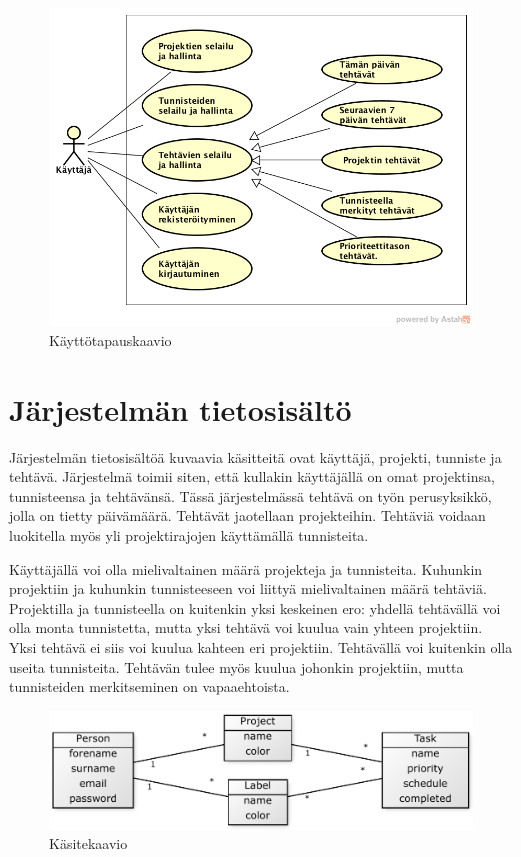 \documentclass[12pt,a4paper,oneside,titlepage,pdftex]{article}
\begin{document}
\begin{figure}[htb]
\begin{center}
\includegraphics[width=\textwidth]{img/kayttotapauskaavio.png}
\caption{Käyttötapauskaavio}
\label{kasitekaavio}
\end{center}
\end{figure}

\section{Järjestelmän tietosisältö}

Järjestelmän tietosisältöä kuvaavia käsitteitä ovat käyttäjä, projekti, tunniste ja tehtävä. Järjestelmä toimii siten, että kullakin käyttäjällä on omat projektinsa, tunnisteensa ja tehtävänsä. Tässä järjestelmässä tehtävä on työn perusyksikkö, jolla on tietty päivämäärä. Tehtävät jaotellaan projekteihin. Tehtäviä voidaan luokitella myös yli projektirajojen käyttämällä tunnisteita.

Käyttäjällä voi olla mielivaltainen määrä projekteja ja tunnisteita. Kuhunkin projektiin ja kuhunkin tunnisteeseen voi liittyä mielivaltainen määrä tehtäviä. Projektilla ja tunnisteella on kuitenkin yksi keskeinen ero: yhdellä tehtävällä voi olla monta tunnistetta, mutta yksi tehtävä voi kuulua vain yhteen projektiin. Yksi tehtävä ei siis voi kuulua kahteen eri projektiin. Tehtävällä voi kuitenkin olla useita tunnisteita. Tehtävän tulee myös kuulua johonkin projektiin, mutta tunnisteiden merkitseminen on vapaaehtoista.

\begin{figure}[htbp]
\begin{center}
\includegraphics[width=\textwidth]{img/kasitekaavio.pdf}
\caption{Käsitekaavio}
\label{kasitekaavio}
\end{center}
\end{figure}
\end{document}
